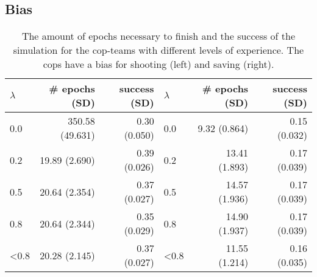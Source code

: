 \subsection{Bias}
\begin{table}[!ht]
\begin{center}
\begin{tabular}{l r  r | l r  r}
$\lambda$ &  \# epochs (SD) & success (SD) & $\lambda$ &  \# epochs (SD) & success (SD)\\
\hline
0.0 & 350.58 (49.631) & 0.30 (0.050) & 0.0 & 9.32 (0.864) & 0.15 (0.032)\\
0.2 & 19.89 (2.690) & 0.39 (0.026) & 0.2 & 13.41 (1.893) & 0.17 (0.039)\\
0.5 & 20.64 (2.354) & 0.37 (0.027) & 0.5 & 14.57 (1.936) & 0.17 (0.039)\\
0.8 & 20.64 (2.344) & 0.35 (0.029) & 0.8 & 14.90 (1.937) & 0.17 (0.039)\\
<0.8 & 20.28 (2.145) & 0.37 (0.027) & <0.8 & 11.55 (1.214) & 0.16 (0.035)\\
\hline
\end{tabular}
\caption{The amount of epochs necessary to finish and the success of the simulation for the cop-teams with different levels of experience. The cops have a bias for shooting (left) and saving (right).}
\label{tab:ResultsBias}
\end{center}
\end{table}
